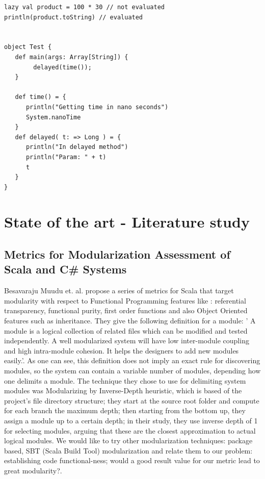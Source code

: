 \documentclass{article}
\begin{document}
\begin{lstlisting}
lazy val product = 100 * 30 // not evaluated
println(product.toString) // evaluated 


object Test {
   def main(args: Array[String]) {
        delayed(time());
   }

   def time() = {
      println("Getting time in nano seconds")
      System.nanoTime
   }
   def delayed( t: => Long ) = {
      println("In delayed method")
      println("Param: " + t)
      t
   }
}

\end{lstlisting}

\section {State of the art - Literature study}

\subsection{Metrics for Modularization Assessment of Scala and C\# Systems}
Besavaraju Muudu et. al. \cite{DBLP:conf/icse/MudduABP13} propose a series of metrics for Scala that target modularity with respect to Functional Programming features like : referential transparency, functional purity, first order functions and also Object Oriented features such as inheritance. They give the following definition for a module: ' A module is a logical collection of related files which can be modified and tested independently. A well modularized system will have low inter-module coupling and high intra-module cohesion. It helps the designers to add new modules easily.'\cite{DBLP:conf/icse/MudduABP13}. As one can see, this definition does not imply an exact rule for discovering  modules, so the system can contain a variable number of modules, depending how one delimits a module. The technique they chose to use for delimiting system modules  was Modularizing by  Inverse-Depth heuristic, which is based of the project's file directory structure; they start at the source root folder and compute for each branch the maximum depth; then starting from the bottom up, they assign a module up to a certain depth; in their study, they use inverse depth of 1 for selecting modules, arguing that these are the closest approximation to actual logical modules. We would like to try other modularization techniques: package based, SBT (Scala Build Tool)  modularization and relate them to our problem: establishing code functional-ness; would a good result value for our metric lead to great modularity?.\par
\end{document}
